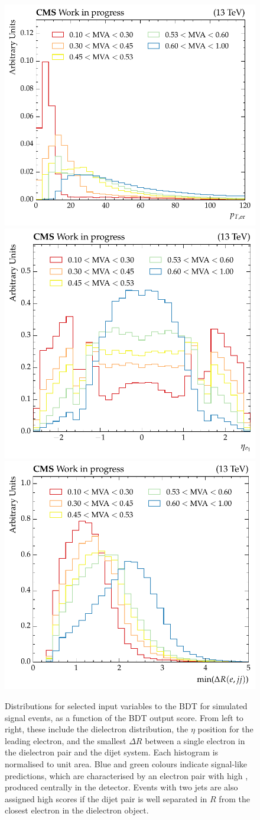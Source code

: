 \begin{figure}[htbp!] 
\centering
\includegraphics[width =0.333\linewidth]{Figures/Hee/ggH/featureEvo/ggH_BDT_pt_reweighted_dielectronPt.pdf}\hfill%
\includegraphics[width =0.32\linewidth]{Figures/Hee/ggH/featureEvo/ggH_BDT_pt_reweighted_leadElectronEta.pdf}\hfill%
\includegraphics[width =0.32\linewidth]{Figures/Hee/ggH/featureEvo/ggH_BDT_pt_reweighted_dijetMinDRJetEle.pdf}\hfill%

\caption[Distributions of selected inputs to the \ggH BDT, as a function of BDT output score.]{Distributions for selected input variables to the \ggH BDT for simulated \ggH signal events, as a function of the \ggH BDT output score. From left to right, these include the dielectron \pt distribution, the $\eta$ position for the leading electron, and the smallest $\Delta R$ between a single electron in the dielectron pair and the dijet system. Each histogram is normalised to unit area. Blue and green colours indicate signal-like predictions, which are characterised by an electron pair with high \pt, produced centrally in the detector. Events with two jets are also assigned high scores if the dijet pair is well separated in $R$ from the closest electron in the dielectron object.}
\label{fig:ggh_sig_evo}
\end{figure}

